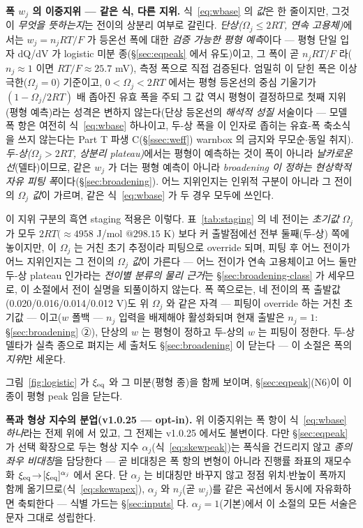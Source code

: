 \textbf{폭 $w_j$ 의 이중지위 --- 같은 식, 다른 지위.} 식~\eqref{eq:wbase} 의 \emph{값}은 한 줄이지만, 그것이
\emph{무엇을 뜻하는지}는 전이의 상분리 여부로 갈린다. \emph{단상($\Omega_j\le2RT$, 연속 고용체)}에서는 $w_j=n_jRT/F$
가 등온선 폭에 대한 \emph{검증 가능한 평형 예측}이다 --- 평형 단일 입자 dQ/dV 가 logistic
미분 종(\S\ref{sec:eqpeak} 에서 유도)이고, 그 폭이 곧 $n_jRT/F$ 라($n_j\!\approx\!1$ 이면 $RT/F\!\approx\!25.7$ mV), 측정 폭으로 직접 검증된다. 엄밀히 이 닫힌 폭은 이상 극한($\Omega_j=0$) 기준이고,
$0<\Omega_j<2RT$ 에서는 평형 등온선의 중심 기울기가 $(1-\Omega_j/2RT)$ 배 좁아진 유효 폭을 주되 그
값 역시 평형이 결정하므로 첫째 지위(평형 예측)라는 성격은 변하지 않는다(단상 등온선의 \emph{해석적 성질}
서술이다 --- 모델 폭 항은 여전히 식~\eqref{eq:wbase} 하나이고, 두-상 폭을 이 인자로 좁히는 유효-폭
축소식을 쓰지 않는다는 Part T 파생 C(\S\ref{ssec:weff}) warnbox 의 금지와 무모순$\cdot$동일 취지).
\emph{두-상($\Omega_j>2RT$, 상분리 plateau)}에서는 평형이 예측하는 것이 폭이 아니라 \emph{날카로운 선}(델타)이므로,
같은 $w_j$ 가 더는 평형 예측이 아니라 \emph{broadening 이 정하는 현상학적 자유 피팅 폭}이다(\S\ref{sec:broadening}).
어느 지위인지는 인위적 구분이 아니라 그 전이의 \emph{$\Omega_j$ 값}이 가르며, 같은 식~\eqref{eq:wbase} 가 두 경우 모두에
쓰인다.

이 지위 구분의 흑연 staging 적용은 이렇다. 표~\ref{tab:staging} 의 네 전이는 \emph{초기값} $\Omega_j$ 가 모두 $2RT(\!\approx\!4958$ J/mol
$@298.15$ K$)$ 보다 커 출발점에선 전부 둘째(두-상) 쪽에 놓이지만, 이 $\Omega_j$ 는 거친 초기 추정이라 피팅으로
override 되며, 피팅 후 어느 전이가 어느 지위인지는 그 전이의 \emph{$\Omega_j$ 값}이 가른다 --- 어느 전이가
연속 고용체이고 어느 둘만 두-상 plateau 인가라는 \emph{전이별 분류의 물리 근거}는 \S\ref{sec:broadening-class} 가
세우므로, 이 소절에서 전이 실명을 되풀이하지 않는다. 폭 쪽으로는, 네 전이의 폭 출발값(0.020/0.016/0.014/0.012 V)도 위 $\Omega_j$ 와 같은 자격 --- 피팅이
override 하는 거친 초기값 --- 이고($w$ 폴백 --- $n_j$ 입력을
배제해야 활성화되며 현재 출발은 $n_j{=}1$: \S\ref{sec:broadening} ②), 단상의 $w$ 는 평형이
정하고 두-상의 $w$ 는 피팅이 정한다. 두-상 델타가 실측 종으로 펴지는 세 출처도 \S\ref{sec:broadening} 이 닫는다 --- 이 소절은 폭의 \emph{지위}만 세운다.

그림~\ref{fig:logistic} 가 $\xi_{\mathrm{eq}}$ 와 그 미분(평형 종)을 함께 보이며, \S\ref{sec:eqpeak}(N6)이 이 종이 평형 peak 임을 닫는다.

\textbf{폭과 형상 지수의 분업(v1.0.25 --- opt-in).} 위 이중지위는 폭 항이 식~\eqref{eq:wbase} \emph{하나}라는
전제 위에 서 있고, 그 전제는 v1.0.25 에서도 불변이다. 다만 \S\ref{sec:eqpeak} 가 선택 확장으로 두는 형상
지수 $\alpha_j$(식~\eqref{eq:skewpeak})는 폭식을 건드리지 않고 \emph{종의 좌우 비대칭}을 담당한다 --- 곧
비대칭은 폭 항의 변형이 아니라 진행률 좌표의 재모수화 $\xi_{\mathrm{eq}}\!\to\![\xi_{\mathrm{eq}}]^{\alpha_j}$ 에서 온다.
단 $\alpha_j$ 는 비대칭만 바꾸지 않고 정점 위치$\cdot$반높이 폭까지 함께 옮기므로(식~\eqref{eq:skewapex}),
$\alpha_j$ 와 $n_j$(곧 $w_j$)를 같은 곡선에서 동시에 자유화하면 축퇴한다 --- 식별 가드는
\S\ref{sec:inputs} 다. $\alpha_j=1$(기본)에서 이 소절의 모든 서술은 문자 그대로 성립한다.

